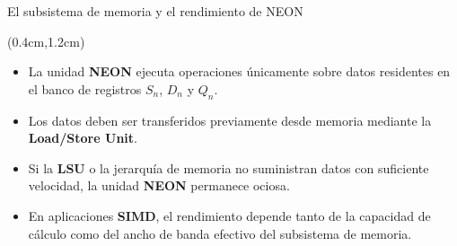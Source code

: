 \begin{frame}{El subsistema de memoria y el rendimiento de NEON}
 \begin{textblock*}{\textwidth}(0.4cm,1.2cm)
  \begin{tcolorbox}[enhanced jigsaw,rounded corners,drop fuzzy shadow=ShadowColor]
   \begin{itemize}[<+->]\justifying
    \item La unidad \textbf{NEON} ejecuta operaciones únicamente sobre datos residentes en el banco de registros $S_{n}$, $D_{n}$ y $Q_{n}$.
    \item Los datos deben ser transferidos previamente desde memoria mediante la \textbf{Load/Store Unit}.
    \item Si la \textbf{LSU} o la jerarquía de memoria no suministran datos con suficiente velocidad, la unidad \textbf{NEON} permanece ociosa.
    \item En aplicaciones \textbf{SIMD}, el rendimiento depende tanto de la capacidad de cálculo como del ancho de banda efectivo del subsistema de memoria.
   \end{itemize}
   \vspace {0.3cm}
  \end{tcolorbox}
 \end{textblock*}
\end{frame}

